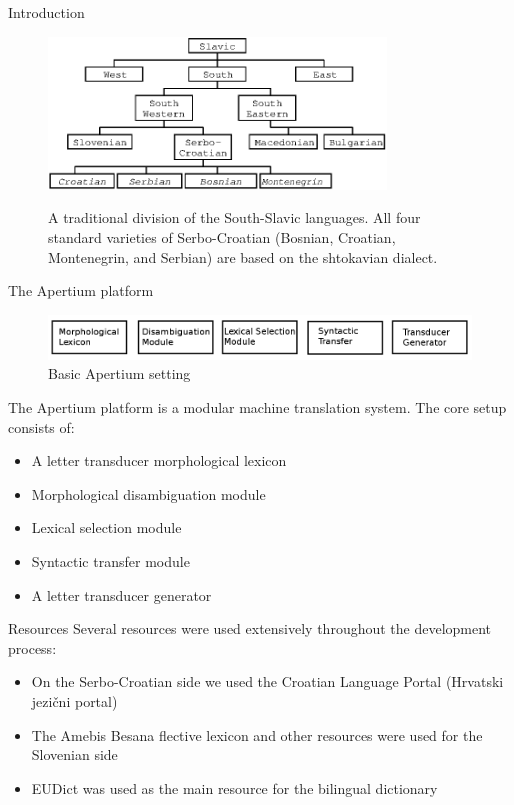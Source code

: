 \documentclass{beamer}
\begin{document}
\begin{frame}{Introduction}

\begin{center}
	\begin{figure}
	\includegraphics[width=0.8\textwidth]{images/chart.eps}
	\label{fig:1}
	\caption{A traditional division of the South-Slavic languages. All four standard varieties of Serbo-Croatian (Bosnian, Croatian,
Montenegrin, and Serbian) are based on the shtokavian dialect.}
	\end{figure}
\end{center}
\end{frame}

\begin{frame}{The Apertium platform}
\begin{figure}
\includegraphics[width=\textwidth]{images/apertium.png}
\caption {Basic Apertium setting}
\end{figure}
The Apertium platform is a modular machine translation system.
The core setup consists of:
\begin{itemize}
\item A letter transducer morphological lexicon
\item Morphological disambiguation module
\item Lexical selection module
\item Syntactic transfer module
\item A letter transducer generator
\end{itemize}
\end{frame}

\begin{frame}{Resources}
Several resources were used extensively throughout the development process:
\begin{itemize}
\item On the Serbo-Croatian side we used the Croatian Language Portal (Hrvatski jezi\v{c}ni portal)
\item The Amebis Besana flective lexicon and other resources were used for the Slovenian side
\item EUDict was used as the main resource for the bilingual dictionary

\end{itemize}
\end{frame}
\end{document}

